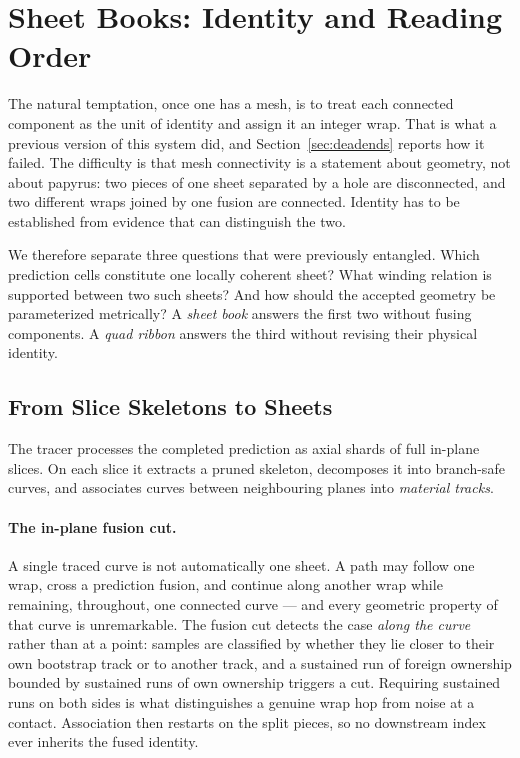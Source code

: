 \section{Sheet Books: Identity and Reading Order}
\label{sec:sheetbooks}


The natural temptation, once one has a mesh, is to treat each connected component as the unit of identity and assign it an integer wrap. That is what a previous version of this system did, and Section~\ref{sec:deadends} reports how it failed. The difficulty is that mesh connectivity is a statement about geometry, not about papyrus: two pieces of one sheet separated by a hole are disconnected, and two different wraps joined by one fusion are connected. Identity has to be established from evidence that can distinguish the two.

We therefore separate three questions that were previously entangled. Which prediction cells constitute one locally coherent sheet? What winding relation is supported between two such sheets? And how should the accepted geometry be parameterized metrically? A \emph{sheet book} answers the first two without fusing components. A \emph{quad ribbon} answers the third without revising their physical identity.

\subsection{From Slice Skeletons to Sheets}
\label{sec:sheets}

The tracer processes the completed prediction as axial shards of full in-plane slices. On each slice it extracts a pruned skeleton, decomposes it into branch-safe curves, and associates curves between neighbouring planes into \emph{material tracks}.

\paragraph{The in-plane fusion cut.} A single traced curve is not automatically one sheet. A path may follow one wrap, cross a prediction fusion, and continue along another wrap while remaining, throughout, one connected curve --- and every geometric property of that curve is unremarkable. The fusion cut detects the case \emph{along the curve} rather than at a point: samples are classified by whether they lie closer to their own bootstrap track or to another track, and a sustained run of foreign ownership bounded by sustained runs of own ownership triggers a cut. Requiring sustained runs on both sides is what distinguishes a genuine wrap hop from noise at a contact. Association then restarts on the split pieces, so no downstream index ever inherits the fused identity.

